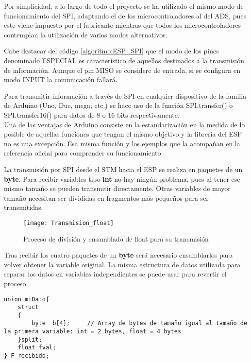 Por simplicidad, a lo largo de todo el proyecto se ha utilizado el mismo modo de funcionamiento del SPI, adaptando el de los microcontroladores al del ADS, pues este viene impuesto por el fabricante mientras que todos los microcontroladores contemplan la utilización de varios modos alternativos.

Cabe destacar del código \ref{algoritmo:ESP_SPI} que el modo de los pines denominado \textsc{ESPECIAL} es característico de aquellos destinados a la transmisión de información. Aunque el pin MISO se considere de entrada, si se configura en modo INPUT la comunicación fallará.

Para transmitir información a través de SPI en cualquier dispositivo de la familia de Arduino (Uno, Due, mega, etc.) se hace uso de la función SPI.transfer() o SPI.transfer16() para datos de 8 o 16 bits respectivamente. \\
Una de las ventajas de Arduino consiste en la estandarización en la medida de lo posible de aquellas funciones que tengan el mismo objetivo y la librería del ESP no es una excepción. Esa misma función y los ejemplos que la acompañan en la referencia oficial para comprender su funcionamiento

\clearpage

La transmisión por SPI desde el STM hacia el ESP se realiza en paquetes de un \textbf{byte}. Para recibir variables tipo \textbf{int} no hay ningún problema, pues al tener ese mismo tamaño se pueden transmitir directamente. Otras variables de mayor tamaño necesitan ser divididas en fragmentos más pequeños para ser transmitidas.

\begin{figure} [h]
    \centering
    \texttt{[image: Transmision\_float]}
    \caption{Proceso de división y ensamblado de float para su transmisión}
    \label{fig:Transmision_float}
\end{figure}

Tras recibir los cuatro paquetes de un \textbf{byte} será necesario ensamblarlos para volver obtener la variable original. La misma estructura de datos utilizada para separar los datos en variables independientes se puede usar para revertir el proceso.

\begin{lstlisting}[label=algoritmo:ESP_split_var,style = STM-code,frame=single,caption=Variables y tipos de dato específicos]
union miDato{
 	struct
	{
		byte  b[4];     // Array de bytes de tamaño igual al tamaño de la primera variable: int = 2 bytes, float = 4 bytes
	}split;
	float fval;
} F_recibido; 
\end{lstlisting}

